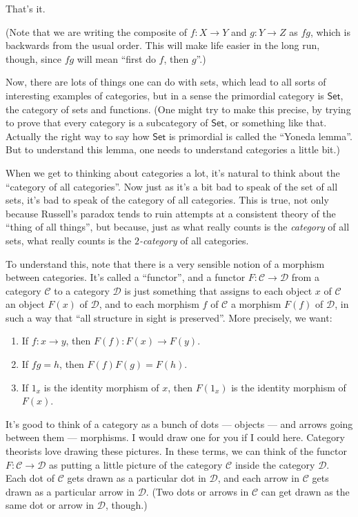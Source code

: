 \documentclass{article}
\begin{document}
That's it.

(Note that we are writing the composite of \(f\colon X \to Y\) and
\(g\colon Y \to Z\) as \(fg\), which is backwards from the usual order.
This will make life easier in the long run, though, since \(fg\) will
mean ``first do \(f\), then \(g\)''.)

Now, there are lots of things one can do with sets, which lead to all
sorts of interesting examples of categories, but in a sense the
primordial category is \(\mathsf{Set}\), the category of sets and
functions. (One might try to make this precise, by trying to prove that
every category is a subcategory of \(\mathsf{Set}\), or something like
that. Actually the right way to say how \(\mathsf{Set}\) is primordial
is called the ``Yoneda lemma''. But to understand this lemma, one needs
to understand categories a little bit.)

When we get to thinking about categories a lot, it's natural to think
about the ``category of all categories''. Now just as it's a bit bad to
speak of the set of all sets, it's bad to speak of the category of all
categories. This is true, not only because Russell's paradox tends to
ruin attempts at a consistent theory of the ``thing of all things'', but
because, just as what really counts is the \emph{category} of all sets,
what really counts is the \emph{\(2\)-category} of all categories.

To understand this, note that there is a very sensible notion of a
morphism between categories. It's called a ``functor'', and a functor
\(F\colon \mathcal{C} \to \mathcal{D}\) from a category \(\mathcal{C}\)
to a category \(\mathcal{D}\) is just something that assigns to each
object \(x\) of \(\mathcal{C}\) an object \(F(x)\) of \(\mathcal{D}\),
and to each morphism \(f\) of \(\mathcal{C}\) a morphism \(F(f)\) of
\(\mathcal{D}\), in such a way that ``all structure in sight is
preserved''. More precisely, we want:

\begin{enumerate}
\def\labelenumi{\arabic{enumi})}
\item
  If \(f\colon x \to y\), then \(F(f)\colon F(x) \to F(y)\).
\item
  If \(fg = h\), then \(F(f)F(g) = F(h)\).
\item
  If \(1_x\) is the identity morphism of \(x\), then \(F(1_x)\) is the
  identity morphism of \(F(x)\).
\end{enumerate}

It's good to think of a category as a bunch of dots --- objects --- and
arrows going between them --- morphisms. I would draw one for you if I
could here. Category theorists love drawing these pictures. In these
terms, we can think of the functor
\(F\colon \mathcal{C} \to \mathcal{D}\) as putting a little picture of
the category \(\mathcal{C}\) inside the category \(\mathcal{D}\). Each
dot of \(\mathcal{C}\) gets drawn as a particular dot in
\(\mathcal{D}\), and each arrow in \(\mathcal{C}\) gets drawn as a
particular arrow in \(\mathcal{D}\). (Two dots or arrows in
\(\mathcal{C}\) can get drawn as the same dot or arrow in
\(\mathcal{D}\), though.)
\end{document}
